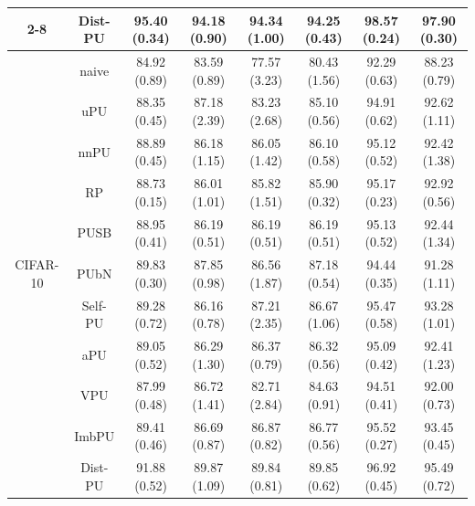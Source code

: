 \documentclass[final]{cvpr}
\newcommand{\ccmark}{\checkmark}%
\newcommand{\blankM}{\color{white}{\checkmark}}
\newcommand{\best}[1]{\textcolor[RGB]{205,83,76}{#1}}
\newcommand{\secondb}[1]{\textcolor[RGB]{0,115,194}{#1}}
\begin{document}
\begin{table}[htp]
{\begin{tabular}{c|c|cccccc}
\cline{2-8}          & Dist-PU & \best{95.40 (0.34) \blankM} & \best{94.18 (0.90) \blankM} & 94.34 (1.00) \blankM & \best{94.25 (0.43) \blankM} & \best{98.57 (0.24) \blankM} & \best{97.90 (0.30) \blankM} \\
    \hline
    \hline
    \multirow{11}[3]{*}{CIFAR-10} & naive & 84.92 (0.89) \ccmark & 83.59 (0.89) \ccmark & 77.57 (3.23) \ccmark & 80.43 (1.56) \ccmark & 92.29 (0.63) \ccmark & 88.23 (0.79) \ccmark \\
          & uPU   & 88.35 (0.45) \ccmark & 87.18 (2.39) \ccmark & 83.23 (2.68) \ccmark & 85.10 (0.56) \ccmark & 94.91 (0.62) \ccmark & 92.62 (1.11) \ccmark \\
          & nnPU  & 88.89 (0.45) \ccmark & 86.18 (1.15) \ccmark & 86.05 (1.42) \ccmark & 86.10 (0.58) \ccmark & 95.12 (0.52) \ccmark & 92.42 (1.38) \ccmark \\
          & RP    & 88.73 (0.15) \ccmark & 86.01 (1.01) \ccmark & 85.82 (1.51) \ccmark & 85.90 (0.32) \ccmark & 95.17 (0.23) \ccmark & 92.92 (0.56) \ccmark \\
          & PUSB  & 88.95 (0.41) \ccmark & 86.19 (0.51) \ccmark & 86.19 (0.51) \ccmark & 86.19 (0.51) \ccmark & 95.13 (0.52) \ccmark & 92.44 (1.34) \ccmark \\
          & PUbN  & \secondb{89.83 (0.30) \ccmark} & \secondb{87.85 (0.98) \ccmark} & 86.56 (1.87) \ccmark & \secondb{87.18 (0.54) \ccmark} & 94.44 (0.35) \ccmark & 91.28 (1.11) \ccmark \\
          & Self-PU & 89.28 (0.72) \ccmark & 86.16 (0.78) \ccmark & \secondb{87.21 (2.35) \ccmark} & 86.67 (1.06) \ccmark & 95.47 (0.58) \ccmark & 93.28 (1.01) \ccmark \\
          & aPU & 89.05 (0.52) \ccmark & 86.29 (1.30) \ccmark & 86.37 (0.79) \ccmark & 86.32 (0.56) \ccmark & 95.09 (0.42) \ccmark & 92.41 (1.23) \ccmark \\
          & VPU   & 87.99 (0.48) \ccmark & 86.72 (1.41) \ccmark & 82.71 (2.84) \ccmark & 84.63 (0.91) \ccmark & 94.51 (0.41) \ccmark & 92.00 (0.73) \ccmark \\
          & ImbPU & 89.41 (0.46) \ccmark & 86.69 (0.87) \ccmark & 86.87 (0.82) \ccmark & 86.77 (0.56) \ccmark & \secondb{95.52 (0.27) \ccmark} & \secondb{93.45 (0.45) \ccmark} \\
\cline{2-8}          & Dist-PU & \best{91.88 (0.52) \blankM} & \best{89.87 (1.09) \blankM} & \best{89.84 (0.81) \blankM} & \best{89.85 (0.62) \blankM} & \best{96.92 (0.45) \blankM} & \best{95.49 (0.72) \blankM} \\
\hline

\end{tabular}}
\end{table}
\end{document}
